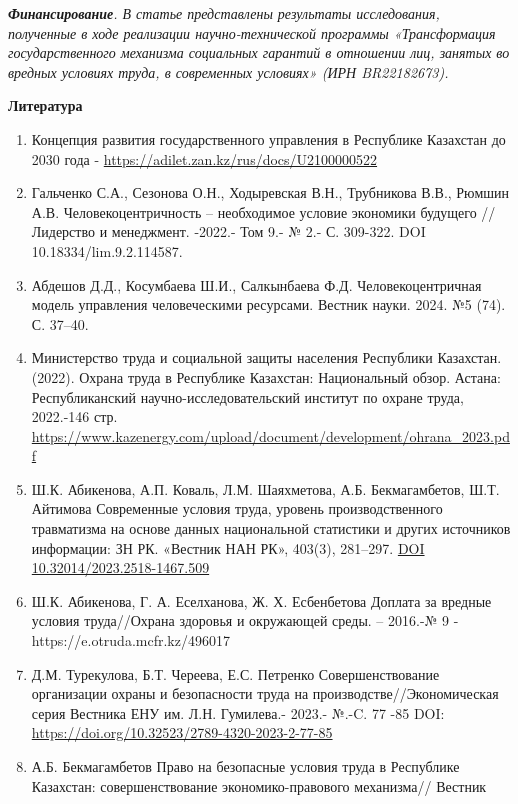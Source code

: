 \emph{{\bfseries Финансирование}. В статье представлены результаты
исследования, полученные в ходе реализации научно-технической программы
«Трансформация государственного механизма социальных гарантий в
отношении лиц, занятых во вредных условиях труда, в современных
условиях» (ИРН BR22182673).}

{\bfseries Литература}

\begin{enumerate}
\def\labelenumi{\arabic{enumi}.}
\item
  Концепция развития государственного управления в Республике Казахстан
  до 2030 года - \url{https://adilet.zan.kz/rus/docs/U2100000522}
\item
  Гальченко С.А., Сезонова О.Н., Ходыревская В.Н., Трубникова В.В.,
  Рюмшин А.В. Человекоцентричность -- необходимое условие экономики
  будущего // Лидерство и менеджмент. -2022.- Том 9.- № 2.- С. 309-322.
  DOI 10.18334/lim.9.2.114587.
\item
  Абдешов Д.Д., Косумбаева Ш.И., Салкынбаева Ф.Д. Человекоцентричная
  модель управления человеческими ресурсами. Вестник науки. 2024. №5
  (74). С. 37--40.
\item
  Министерство труда и социальной защиты населения Республики Казахстан.
  (2022). Охрана труда в Республике Казахстан: Национальный обзор.
  Астана: Республиканский научно-исследовательский институт по охране
  труда, 2022.-146 стр.
  \url{https://www.kazenergy.com/upload/document/development/ohrana_2023.pdf}
\item
  Ш.К. Абикенова, А.П. Коваль, Л.М. Шаяхметова, А.Б. Бекмагамбетов, Ш.Т.
  Айтимова Современные условия труда, уровень производственного
  травматизма на основе данных национальной статистики и других
  источников информации: ЗН РК. «Вестник НАН РК», 403(3), 281--297.
  \href{https://doi.org/10.32014/2023.2518-1467.509}{DOI
  10.32014/2023.2518-1467.509}
\item
  Ш.К. Абикенова, Г. А. Еселханова, Ж. Х. Есбенбетова Доплата за вредные
  условия труда//Охрана здоровья и окружающей среды. -- 2016.-№ 9 -
  https://e.otruda.mcfr.kz/496017
\item
  Д.М. Турекулова, Б.Т. Череева, Е.С. Петренко Совершенствование
  организации охраны и безопасности труда на производстве//Экономическая
  серия Вестника ЕНУ им. Л.Н. Гумилева.- 2023.- №.-C. 77 -85 DOI:
  \url{https://doi.org/10.32523/2789-4320-2023-2-77-85}
\item
  А.Б. Бекмагамбетов Право на безопасные условия труда в Республике
  Казахстан: совершенствование экономико-правового механизма// Вестник

\end{enumerate}

